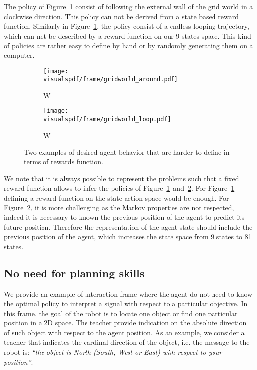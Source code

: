 The policy of Figure~\ref{fig:gridwolrdgenericframesaround} consist of following the external wall of the grid world in a clockwise direction. This policy can not be derived from a state based reward function. Similarly in Figure~\ref{fig:gridwolrdgenericframesaround}, the policy consist of a endless looping trajectory, which can not be described by a reward function on our 9 states space. This kind of policies are rather easy to define by hand or by randomly generating them on a computer. 

\begin{figure}[!ht]
\centering
    \begin{subfigure}[b]{0.49\columnwidth}
        \centering
        \texttt{[image: \\visualspdf/frame/gridworld\_around.pdf]}
        \caption{W}
        \label{fig:gridwolrdgenericframesaround}
    \end{subfigure}
    \begin{subfigure}[b]{0.49\columnwidth}
        \centering
        \texttt{[image: \\visualspdf/frame/gridworld\_loop.pdf]}
        \caption{W}
        \label{fig:gridwolrdgenericframesloop}
    \end{subfigure}
\caption{Two examples of desired agent behavior that are harder to define in terms of rewards function.}
\label{fig:gridwolrdgenericframes}
\end{figure}

We note that it is always possible to represent the problems such that a fixed reward function allows to infer the policies of Figure~\ref{fig:gridwolrdgenericframesaround}~and~\ref{fig:gridwolrdgenericframesloop}. For Figure~\ref{fig:gridwolrdgenericframesaround} defining a reward function on the state-action space would be enough. For Figure~\ref{fig:gridwolrdgenericframesloop}, it is more challenging as the Markov properties are not respected, indeed it is necessary to known the previous position of the agent to predict its future position. Therefore the representation of the agent state should include the previous position of the agent, which increases the state space from 9 states to 81 states.

\subsection{No need for planning skills}

We provide an example of interaction frame where the agent do not need to know the optimal policy to interpret a signal with respect to a particular objective. In this frame, the goal of the robot is to locate one object or find one particular position in a 2D space. The teacher provide indication on the absolute direction of such object with respect to the agent position. As an example, we consider a teacher that indicates the cardinal direction of the object, i.e. the message to the robot is: \emph{``the object is North (South, West or East) with respect to your position''}.

